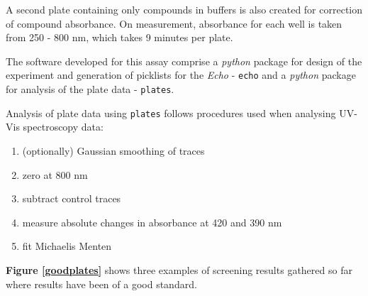\documentclass{article}
\begin{document}
\par
A second plate containing only compounds in buffers is also created for correction of compound absorbance. On measurement, absorbance for each well is taken from 250 - 800 nm, which takes 9 minutes per plate. 
\par
The software developed for this assay comprise a \textit{python} package for design of the experiment and generation of picklists for the \textit{Echo} - \texttt{echo} and a \textit{python} package for analysis of the plate data - \texttt{plates}.
\par
Analysis of plate data using \texttt{plates} follows procedures used when analysing UV-Vis spectroscopy data:
\begin{enumerate}
	\item (optionally) Gaussian smoothing of traces
	\item zero at 800 nm
	\item subtract control traces
	\item measure absolute changes in absorbance at 420 and 390 nm
	\item fit Michaelis Menten 
\end{enumerate}
\par 
\textbf{Figure \ref{goodplates}} shows three examples of screening results gathered so far where results have been of a good standard.
\par
\end{document}
